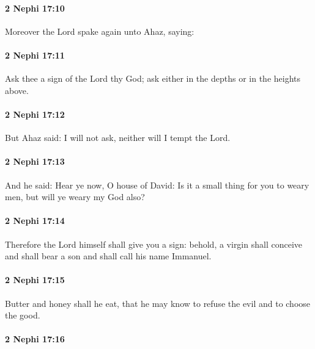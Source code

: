 		\paragraph{2 Nephi 17:10} %
			\label{2NEPHI-17-10}

			Moreover the Lord spake again unto Ahaz, saying:

		\paragraph{2 Nephi 17:11} %
			\label{2NEPHI-17-11}

			Ask thee a sign of the Lord thy God;
			ask either in the depths or in the heights above.

		\paragraph{2 Nephi 17:12} %
			\label{2NEPHI-17-12}

			But Ahaz said:
			I will not ask, neither will I tempt the Lord.

		\paragraph{2 Nephi 17:13} %
			\label{2NEPHI-17-13}

			And he said:
			Hear ye now, O house of David:
			Is it a small thing for you to weary men,
			but will ye weary my God also?

		\paragraph{2 Nephi 17:14} %
			\label{2NEPHI-17-14}

			Therefore the Lord himself shall give you a sign:
			behold, a virgin shall conceive and shall bear a son
			and shall call his name Immanuel.

		\paragraph{2 Nephi 17:15} %
			\label{2NEPHI-17-15}

			Butter and honey shall he eat,
			that he may know to refuse the evil and to choose the good.

		\paragraph{2 Nephi 17:16} %
			\label{2NEPHI-17-16}

